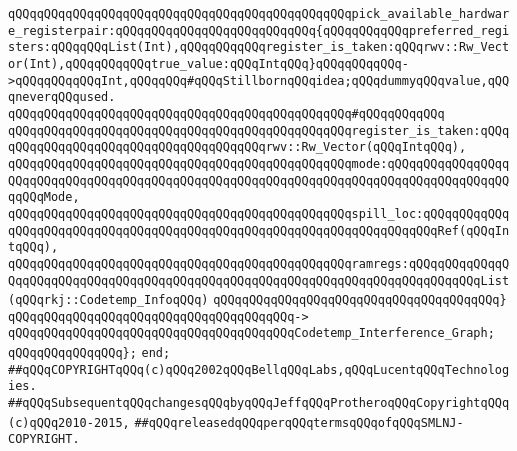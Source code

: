 \verb|qQQqqQQqqQQqqQQqqQQqqQQqqQQqqQQqqQQqqQQqqQQqqQQqpick_available_hardware_registerpair:qQQqqQQqqQQqqQQqqQQqqQQqqQQq{qQQqqQQqqQQqpreferred_registers:qQQqqQQqList(Int),qQQqqQQqqQQqregister_is_taken:qQQqrwv::Rw_Vector(Int),qQQqqQQqqQQqtrue_value:qQQqIntqQQq}qQQqqQQqqQQq->qQQqqQQqqQQqInt,qQQqqQQq#qQQqStillbornqQQqidea;qQQqdummyqQQqvalue,qQQqneverqQQqused.|\newline
\verb|qQQqqQQqqQQqqQQqqQQqqQQqqQQqqQQqqQQqqQQqqQQqqQQq#qQQqqQQqqQQq|\newline
\verb|qQQqqQQqqQQqqQQqqQQqqQQqqQQqqQQqqQQqqQQqqQQqqQQqregister_is_taken:qQQqqQQqqQQqqQQqqQQqqQQqqQQqqQQqqQQqqQQqrwv::Rw_Vector(qQQqIntqQQq),|\newline
\verb|qQQqqQQqqQQqqQQqqQQqqQQqqQQqqQQqqQQqqQQqqQQqqQQqmode:qQQqqQQqqQQqqQQqqQQqqQQqqQQqqQQqqQQqqQQqqQQqqQQqqQQqqQQqqQQqqQQqqQQqqQQqqQQqqQQqqQQqqQQqqQQqMode,|\newline
\verb|qQQqqQQqqQQqqQQqqQQqqQQqqQQqqQQqqQQqqQQqqQQqqQQqspill_loc:qQQqqQQqqQQqqQQqqQQqqQQqqQQqqQQqqQQqqQQqqQQqqQQqqQQqqQQqqQQqqQQqqQQqqQQqRef(qQQqIntqQQq),|\newline
\verb|qQQqqQQqqQQqqQQqqQQqqQQqqQQqqQQqqQQqqQQqqQQqqQQqramregs:qQQqqQQqqQQqqQQqqQQqqQQqqQQqqQQqqQQqqQQqqQQqqQQqqQQqqQQqqQQqqQQqqQQqqQQqqQQqqQQqList(qQQqrkj::Codetemp_InfoqQQq)|\newline
\verb|qQQqqQQqqQQqqQQqqQQqqQQqqQQqqQQqqQQqqQQq}|\newline
\verb|qQQqqQQqqQQqqQQqqQQqqQQqqQQqqQQqqQQqqQQq->|\newline
\verb|qQQqqQQqqQQqqQQqqQQqqQQqqQQqqQQqqQQqqQQqCodetemp_Interference_Graph;|\newline
\newline
\verb|qQQqqQQqqQQqqQQq};|\newline
\verb|end;|\newline
\newline
\verb|##qQQqCOPYRIGHTqQQq(c)qQQq2002qQQqBellqQQqLabs,qQQqLucentqQQqTechnologies.|\newline
\verb|##qQQqSubsequentqQQqchangesqQQqbyqQQqJeffqQQqProtheroqQQqCopyrightqQQq(c)qQQq2010-2015,|\newline
\verb|##qQQqreleasedqQQqperqQQqtermsqQQqofqQQqSMLNJ-COPYRIGHT.|\newline

